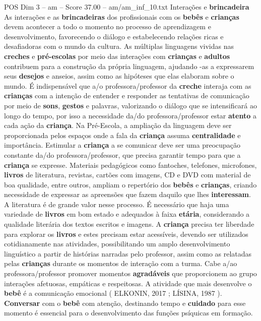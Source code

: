 \begin{textsample}{POS Dim 3 – am – Score 37.00 – am/am\_inf\_10.txt}  \label{ex:f3_pos_033}
Interações e \textbf{brincadeira} As interações e as \textbf{brincadeiras} dos profissionais com os \textbf{bebês} e \textbf{crianças} devem acontecer a todo o momento no processo de aprendizagem e desenvolvimento, favorecendo o diálogo e estabelecendo relações ricas e desafiadoras com o mundo da cultura.
As múltiplas linguagens vividas nas \textbf{creches} e \textbf{pré-escolas} por meio das interações com \textbf{crianças} e \textbf{adultos} contribuem para a construção da própria linguagem, ajudando -as a expressarem seus \textbf{desejos} e anseios, assim como as hipóteses que elas elaboram sobre o mundo.
É indispensável que a/o professora/professor da \textbf{creche} interaja com as \textbf{crianças} com a intenção de entender e responder as tentativas de comunicação por meio de \textbf{sons}, \textbf{gestos} e palavras, valorizando o diálogo que se intensificará ao longo do tempo, por isso a necessidade da/do professora/professor estar \textbf{atento} a cada ação da \textbf{criança}.
Na Pré-Escola, a ampliação da linguagem deve ser proporcionada pelos espaços onde a fala da \textbf{criança} assuma \textbf{centralidade} e importância.
Estimular a \textbf{criança} a se comunicar deve ser uma preocupação constante da/do professora/professor, que precisa garantir tempo para que a \textbf{criança} se expresse.
Materiais pedagógicos como fantoches, telefones, microfones, \textbf{livros} de literatura, revistas, cartões com imagens, CD e DVD com material de boa qualidade, entre outros, ampliam o repertório dos \textbf{bebês} e \textbf{crianças}, criando necessidade de expressar as apreensões que fazem daquilo que lhes \textbf{interessam}.
A literatura é de grande valor nesse processo.
É necessário que haja uma variedade de \textbf{livros} em bom estado e adequados à faixa \textbf{etária}, considerando a qualidade literária dos textos escritos e imagens.
A \textbf{criança} precisa ter liberdade para explorar os \textbf{livros} e estes precisam estar acessíveis, devendo ser utilizados cotidianamente nas atividades, possibilitando um amplo desenvolvimento linguístico a partir de histórias narradas pelo professor, assim como as relatadas pelas \textbf{crianças} durante os momentos de interação com a turma.
Cabe a/ao professora/professor promover momentos \textbf{agradáveis} que proporcionem ao grupo interações afetuosas, empáticas e respeitosas.
A atividade que mais desenvolve o \textbf{bebê} é a comunicação emocional ( ELKONIN, 2017 ; LÍSINA, 1987 ). \textbf{Conversar} com o \textbf{bebê} com atenção, destinando tempo e \textbf{cuidado} para esse momento é essencial para o desenvolvimento das funções psíquicas em formação.

\end{textsample}
